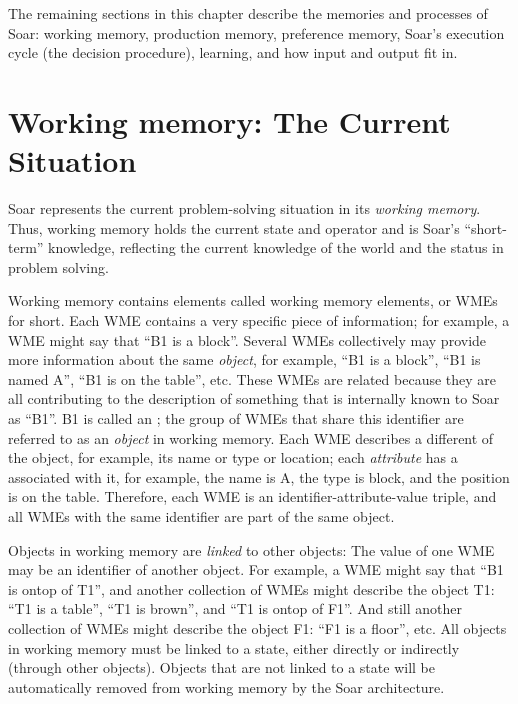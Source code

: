 The remaining sections in this chapter describe the memories and processes of Soar:
working memory, production memory, preference memory, Soar's execution cycle (the decision
procedure), learning, and how  input and output fit in.
\section{Working memory: The Current Situation} 
\label{ARCH-wm}

Soar represents the current problem-solving situation in its \emph{working
memory}. Thus, working memory holds the current state and operator and is Soar's
``short-term'' knowledge, reflecting the current knowledge of the world and
the status in problem solving.

Working memory contains elements called working memory elements, or WMEs for
short. Each WME contains a very specific piece of information; for example, a WME
might say that ``B1 is a block''. 
Several WMEs collectively may provide more information about the same
\textit{object}, for example, ``B1 is a block'', ``B1 is named A'', ``B1 is on
the table'', etc. These WMEs are related because they are all contributing to
the description of something that is internally known to Soar as ``B1''. B1 is
called an ; the group of WMEs that share this identifier
are referred to as an \textit{object} in working memory. 
Each WME describes a different  of the object, for example,
its name or type or location; each \textit{attribute} has a  associated
with it, for example, the name is A, the type is block, and the position is on
the table. Therefore, each WME is an identifier-attribute-value triple, and
all WMEs with the same identifier are part of the same object.

Objects in working memory are \emph{linked} to other objects: The value of one
WME may be an identifier of another object. For example, a WME might say that
``B1 is ontop of T1'', and another collection of WMEs might describe the
object T1: ``T1 is a table'', ``T1 is brown'', and ``T1 is ontop of F1''. And
still another collection of WMEs might describe the object F1: ``F1 is a
floor'', etc. All objects in working memory must be linked to a state, either
directly or indirectly (through other objects). Objects that are not linked to
a state will be automatically removed from working memory by the Soar
architecture. 

